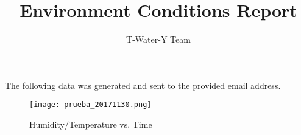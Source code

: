 \documentclass[12pt]{article}
\begin{document}
 
 
 
\title{Environment Conditions Report}%
\author{T-Water-Y Team\\ %
} %

\maketitle 
 

The following data was generated and sent to the provided email address.


\begin{figure}[ht]
\centering
     \texttt{[image: prueba\_20171130.png]}
      \caption{Humidity/Temperature vs. Time}
       \label{normal_case}
\end{figure}


 
 
\end{document}
